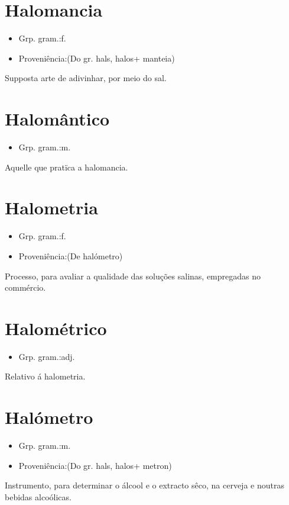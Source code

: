 \documentclass{article}
\begin{document}
\section{Halomancia}
\begin{itemize}
\item {Grp. gram.:f.}
\end{itemize}
\begin{itemize}
\item {Proveniência:(Do gr. \textunderscore hals\textunderscore , \textunderscore halos\textunderscore  + \textunderscore manteia\textunderscore )}
\end{itemize}
Supposta arte de adivinhar, por meio do sal.
\section{Halomântico}
\begin{itemize}
\item {Grp. gram.:m.}
\end{itemize}
Aquelle que pratïca a halomancia.
\section{Halometria}
\begin{itemize}
\item {Grp. gram.:f.}
\end{itemize}
\begin{itemize}
\item {Proveniência:(De \textunderscore halómetro\textunderscore )}
\end{itemize}
Processo, para avaliar a qualidade das soluções salinas, empregadas no commércio.
\section{Halométrico}
\begin{itemize}
\item {Grp. gram.:adj.}
\end{itemize}
Relativo á halometria.
\section{Halómetro}
\begin{itemize}
\item {Grp. gram.:m.}
\end{itemize}
\begin{itemize}
\item {Proveniência:(Do gr. \textunderscore hals\textunderscore , \textunderscore halos\textunderscore  + \textunderscore metron\textunderscore )}
\end{itemize}
Instrumento, para determinar o álcool e o extracto sêco, na cerveja e noutras bebidas alcoólicas.
\end{document}
